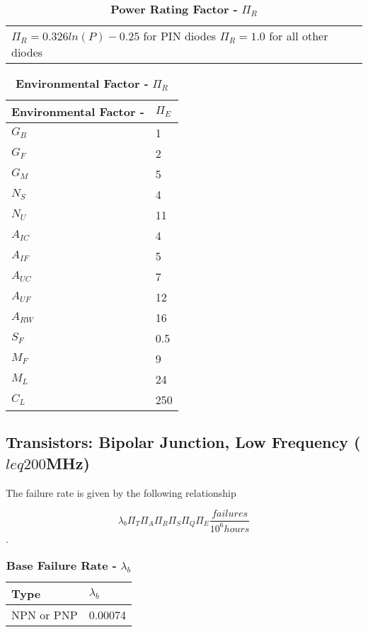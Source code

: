 \begin{table}
\caption{\textbf{Power Rating Factor -} $\Pi_{R}$}
\label{table:powerRatingFactorFast}
\begin{tabular}{l} 
$\Pi_{R} = 0.326ln(P)-0.25$ for PIN diodes
$\Pi_{R} = 1.0$ for all other diodes
\end{tabular}
\end{table}

\begin{table}
\caption{\textbf{Environmental Factor -} $\Pi_{R}$}
\label{table:environmentalFactorFast}
\begin{tabular}{|l|m{10cm}|} \hline
\textbf{Environmental Factor -} & $\Pi_{E}$ \\ \hline
$G_{B}$ & 1 \\ \hline
$G_{F}$ & 2 \\ \hline
$G_{M}$ & 5 \\ \hline
$N_{S}$ & 4 \\ \hline
$N_{U}$ & 11 \\ \hline
$A_{IC}$ & 4 \\ \hline
$A_{IF}$ & 5 \\ \hline
$A_{UC}$ & 7 \\ \hline
$A_{UF}$ & 12 \\ \hline
$A_{RW}$ & 16 \\ \hline
$S_{F}$ & 0.5 \\ \hline
$M_{F}$ & 9 \\ \hline
$M_{L}$ & 24 \\ \hline
$C_{L}$ & 250 \\ \hline
\end{tabular}
\end{table}

\subsection{Transistors: Bipolar Junction, Low Frequency ($leq 200$MHz)}
\label{subsection:transistors-bipolar-junction-low-frequency-200mhz}

The failure rate is given by the following relationship

$$\lambda_{b} \Pi_T \Pi_A \Pi_R \Pi_S \Pi_Q \Pi_E \frac{failures}{10^6 hours}$$.

\begin{table}
\caption{\textbf{Base Failure Rate -} $\lambda_{b}$}
\label{table:baseFailureRateTransSlow}
\begin{tabular}{|l|m{10cm}|} \hline
\textbf{Type} & $\lambda_{b}$ \\ \hline
NPN or PNP & 0.00074 \\ \hline
\end{tabular}
\end{table}

